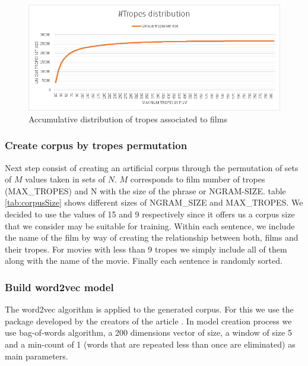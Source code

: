 \documentclass[letterpaper]{article}
\begin{document}
	\begin{figure}
		\centering
		\includegraphics[width=1\linewidth]{../images/tropes_distribution_chart.png}
		\caption{Accumulative distribution of tropes associated to films}
		\label{fig:tropesdistributionasociatedtofilms}
	\end{figure}
	
	\subsubsection{Create corpus by tropes permutation}
	Next step consist of creating an artificial corpus through the permutation of sets of $M$ values taken in sets of $N$. $M$ corresponds to film number of tropes  (MAX\_TROPES) and N with the size of the phrase or NGRAM-SIZE. table \ref{tab:corpusSize} shows different sizes of NGRAM\_SIZE and MAX\_TROPES. We decided to use the values of 15 and 9 respectively since it offers us a corpus size that we consider may be suitable for training. Within each sentence, we include the name of the film by way of creating the relationship between both, films and their tropes. 
	For movies with less than 9 tropes we simply include all of them along with the name of the movie. Finally each sentence is randomly sorted.
	
	\subsubsection{Build word2vec model}
	
	The word2vec algorithm is applied to the generated corpus. For
        this we use the package \cite{git-hub-word2vec} developed by
        the creators of the article \cite{mikolov2013}. In model
        creation process we use bag-of-words algorithm, a 200
        dimensions vector of size, a window of size 5 and a min-count
        of 1 (words that are repeated less than once are eliminated)
        as main parameters. %
	
\end{document}
